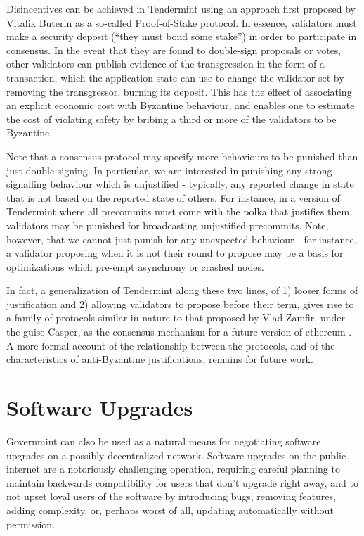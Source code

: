 Disincentives can be achieved in Tendermint using an approach first proposed by Vitalik Buterin \cite{slasher} as a so-called Proof-of-Stake protocol.
In essence, validators must make a security deposit (``they must bond some stake'')
in order to participate in consensus.
In the event that they are found to double-sign proposals or votes, 
other validators can publish evidence of the transgression in the form of a transaction, 
which the application state can use to change the validator set by removing the transgressor, burning its deposit.
This has the effect of associating an explicit economic cost with Byzantine behaviour, 
and enables one to estimate the cost of violating safety by bribing a third or more of the validators to be Byzantine.

Note that a consensus protocol may specify more behaviours to be punished than just double signing.
In particular, we are interested in punishing any strong signalling behaviour which is unjustified - typically, any reported change in state that is not based on the reported state of others.
For instance, in a version of Tendermint where all precommits 
must come with the polka that justifies them,
validators may be punished for broadcasting unjustified precommits.
Note, however, that we cannot just punish for any unexpected behaviour - 
for instance, a validator proposing when it is not their round to propose
may be a basis for optimizations which pre-empt asynchrony or crashed nodes.

In fact, a generalization of Tendermint along these two lines, 
of 1) looser forms of justification and 2) allowing validators to propose before their term,
gives rise to a family of protocols similar in nature to that proposed by Vlad Zamfir,
under the guise Casper, as the consensus mechanism for a future version of ethereum \cite{casper}.
A more formal account of the relationship between the protocols, 
and of the characteristics of anti-Byzantine justifications, remains for future work.

\section{Software Upgrades}

Governmint can also be used as a natural means for negotiating software upgrades on a possibly decentralized network.
Software upgrades on the public internet are a notoriously challenging operation,
requiring careful planning to maintain backwards compatibility for users that don't upgrade right away,
and to not upset loyal users of the software by introducing bugs, removing features, adding complexity, or,
perhaps worst of all, updating automatically without permission.

